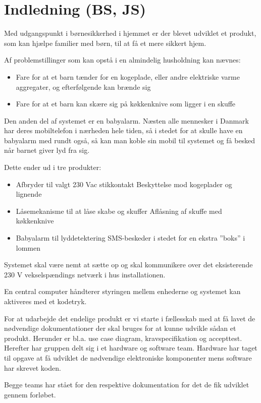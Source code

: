 \chapter{Indledning (BS, JS)}

Med udgangspunkt i børnesikkerhed i hjemmet er der blevet udviklet et produkt, som kan hjælpe familier med børn, til at få et mere sikkert hjem.

Af problemstillinger som kan opstå i en almindelig husholdning kan nævnes:
\begin{itemize}
	\item Fare for at et barn tænder for en kogeplade, eller andre elektriske varme aggregater, og efterfølgende kan brænde sig
	\item Fare for at et barn kan skære sig på køkkenknive som ligger i en skuffe
\end{itemize}

Den anden del af systemet er en babyalarm. Næsten alle mennesker i Danmark har deres mobiltelefon i nærheden hele tiden, så i stedet for at skulle have en babyalarm med rundt også, så kan man koble sin mobil til systemet og få besked når barnet giver lyd fra sig.

Dette ender ud i tre produkter:

\begin{itemize}
\item Afbryder til valgt 230 Vac stikkontakt
\subitem Beskyttelse mod kogeplader og lignende
\item Låsemekanisme til at låse skabe og skuffer
\subitem Aflåsning af skuffe med køkkenknive
\item Babyalarm til lyddetektering
\subitem SMS-beskeder i stedet for en ekstra ''boks'' i lommen
\end{itemize}

Systemet skal være nemt at sætte op og skal kommunikere over det eksisterende 230 V vekselspændings netværk i hus installationen.

En central computer håndterer styringen mellem enhederne og systemet kan aktiveres med et kodetryk.

For at udarbejde det endelige produkt er vi starte i fællesskab med at få lavet de nødvendige dokumentationer der skal bruges for at kunne udvikle sådan et produkt. Herunder er bl.a. use case diagram, kravspecifikation og accepttest. Herefter har gruppen delt sig i et hardware og software team. Hardware har taget til opgave at få udviklet de nødvendige elektroniske komponenter mens software har skrevet koden.

Begge teams har stået for den respektive dokumentation for det de fik udviklet gennem forløbet. 